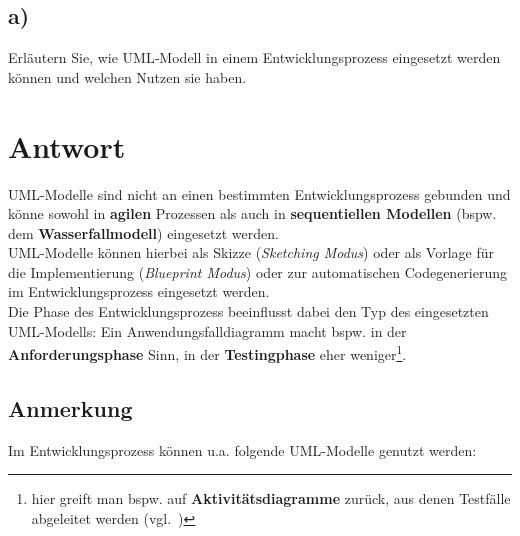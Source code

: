 \subsection*{a)}
Erläutern Sie, wie UML‐Modell in einem Entwicklungsprozess eingesetzt werden können und welchen Nutzen sie haben.


\section*{Antwort}
UML-Modelle sind nicht an einen bestimmten Entwicklungsprozess gebunden und könne sowohl in \textbf{agilen} Prozessen als auch in \textbf{sequentiellen Modellen} (bspw. dem \textbf{Wasserfallmodell}) eingesetzt werden.\\

\noindent
UML-Modelle können hierbei als Skizze (\textit{Sketching Modus}) oder als Vorlage für die Implementierung (\textit{Blueprint Modus}) oder zur automatischen Codegenerierung im Entwicklungsprozess eingesetzt werden.\\
Die Phase des Entwicklungsprozess beeinflusst dabei den Typ des eingesetzten UML-Modells: Ein Anwendungsfalldiagramm macht bspw. in der \textbf{Anforderungsphase} Sinn, in der \textbf{Testingphase} eher weniger\footnote{hier greift man bspw. auf \textbf{Aktivitätsdiagramme} zurück, aus denen Testfälle abgeleitet werden (vgl.~\cite[57]{Buh09})}.

\subsection*{Anmerkung}
Im Entwicklungsprozess können u.a. folgende UML-Modelle genutzt werden:


